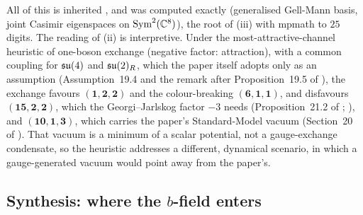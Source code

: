 All of this is inherited \cite{NambuJonaLasinio61,Slansky81}, and was computed exactly (generalised Gell-Mann basis, joint Casimir eigenspaces on
$\mathrm{Sym}^2(\mathbb{C}^8)$), the root of (iii) with mpmath to $25$ digits. The reading of (ii) is interpretive. Under the most-attractive-channel heuristic
of one-boson exchange \cite{RabyDimopoulosSusskind80} (negative factor: attraction), with a common coupling for $\mathfrak{su}(4)$ and $\mathfrak{su}(2)_R$, which the paper
itself adopts only as an assumption (Assumption~19.4 and the remark after Proposition~19.5 of \cite{ES17}), the exchange favours
$(\mathbf1,\mathbf2,\mathbf2)$ and the colour-breaking $(\mathbf6,\mathbf1,\mathbf1)$, and disfavours $(\mathbf{15},\mathbf2,\mathbf2)$, which the Georgi--Jarlskog factor
$-3$ needs (Proposition~21.2 of \cite{ES17}; \cite{GeorgiJarlskog79}), and $(\mathbf{10},\mathbf1,\mathbf3)$, which carries the paper's Standard-Model vacuum
(Section~20 of \cite{ES17}). That vacuum is a minimum of a scalar potential, not a gauge-exchange condensate, so the heuristic addresses a
different, dynamical scenario, in which a gauge-generated vacuum would point away from the paper's.

\subsection{\texorpdfstring{Synthesis: where the $b$-field enters}{Synthesis: where the b-field enters}}
\label{d4:sec:synthesis}


